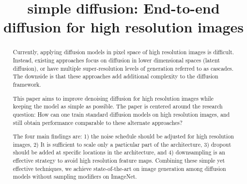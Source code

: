 \title{simple diffusion: End-to-end diffusion for high resolution images}




\printAffiliationsAndNotice{\icmlEqualContribution} %

\begin{abstract}
Currently, applying diffusion models in pixel space of high resolution images is difficult. Instead, existing approaches focus on diffusion in lower dimensional spaces (latent diffusion), or have multiple super-resolution levels of generation referred to as cascades. The downside is that these approaches add additional complexity to the diffusion framework.

This paper aims to improve denoising diffusion for high resolution images while keeping the model as simple as possible. The paper is centered around the research question: How can one train standard diffusion models on high resolution images, and still obtain performance comparable to these alternate approaches? 

The four main findings are: 1) the noise schedule should be adjusted for high resolution images, 2) It is sufficient to scale only a particular part of the architecture, 3) dropout should be added at specific locations in the architecture, and 4) downsampling is an effective strategy to avoid high resolution feature maps. Combining these simple yet effective techniques, we achieve state-of-the-art on image generation among diffusion models without sampling modifiers on ImageNet.\end{abstract}

